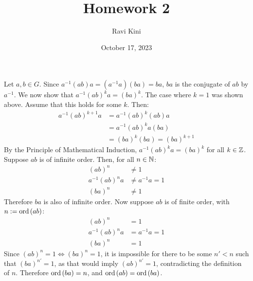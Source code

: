 \documentclass{article}
\title{Homework 2}
\author{Ravi Kini}
\date{October 17, 2023}
\begin{document}
\maketitle

\problem
Let $a,b \in G$. Since $a^{-1}\left(ab\right)a = \left(a^{-1}a\right)\left(ba\right) = ba$, $ba$ is the conjugate of $ab$ by $a^{-1}$. We now show that $a^{-1}\left(ab\right)^ka = \left(ba\right)^k$. The case where $k = 1$ was shown above. Assume that this holds for some $k$. Then:
\begin{equation}
    \begin{split}
        a^{-1}\left(ab\right)^{k + 1}a & = a^{-1}\left(ab\right)^{k}\left(ab\right)a \\
        & = a^{-1}\left(ab\right)^{k}a\left(ba\right) \\
        & = \left(ba\right)^k\left(ba\right) = \left(ba\right)^{k + 1}
    \end{split}
\end{equation}
By the Principle of Mathematical Induction, $a^{-1}\left(ab\right)^ka = \left(ba\right)^k$ for all $k \in \mathbb{Z}$. Suppose $ab$ is of infinite order. Then, for all $n \in \mathbb{N}$:
\begin{equation}
    \begin{split}
        \left(ab\right)^n & \neq 1 \\
        a^{-1}\left(ab\right)^na & \neq a^{-1}a = 1 \\
        \left(ba\right)^n & \neq 1
    \end{split}
\end{equation}
Therefore $ba$ is also of infinite order. Now suppose $ab$ is of finite order, with $n := \operatorname{ord}\left(ab\right)$:
\begin{equation}
    \begin{split}
        \left(ab\right)^n & = 1 \\
        a^{-1}\left(ab\right)^na & = a^{-1}a = 1 \\
        \left(ba\right)^n & = 1
    \end{split}
\end{equation}
Since $\left(ab\right)^n = 1 \iff \left(ba\right)^n = 1$, it is impossible for there to be some $n' < n$ such that $\left(ba\right)^{n'} = 1$, as that would imply $\left(ab\right)^{n'} = 1$, contradicting the definition of $n$. Therefore $\operatorname{ord}\left(ba\right) = n$, and $\operatorname{ord}\left(ab\right) = \operatorname{ord}\left(ba\right)$.

\clearpage

\end{document}
